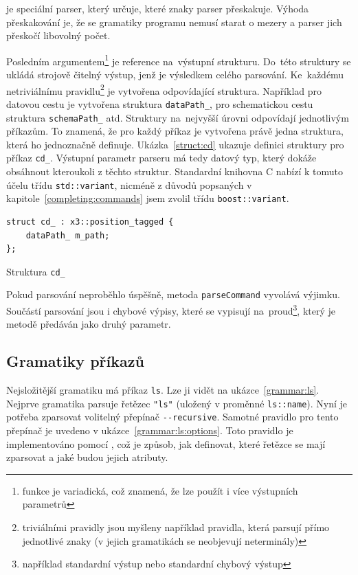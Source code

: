 \documentclass[thesis=B,czech,hidelinks]{FITthesis}[2019/03/06]
\newcommand{\Rplus}{\protect\hspace{-.1em}\protect\raisebox{.35ex}{\smaller{\smaller\textbf{+}}}}
\newcommand{\Cpp}{\mbox{C\Rplus\Rplus}\xspace}
\begin{document}
 je speciální parser, který určuje, které znaky parser přeskakuje. Výhoda přeskakování je, že se gramatiky programu nemusí starat o mezery a parser jich přeskočí libovolný počet.

Posledním argumentem\footnote{funkce je variadická, což znamená, že lze použít i více výstupních parametrů} je reference na~výstupní strukturu. Do~této struktury se ukládá strojově čitelný výstup, jenž je výsledkem celého parsování. Ke~každému netriviálnímu pravidlu\footnote{triviálními pravidly jsou myšleny například pravidla, která parsují přímo jednotlivé znaky (v jejich gramatikách se neobjevují neterminály)} je vytvořena odpovídající struktura. Například pro datovou cestu je vytvořena struktura \texttt{dataPath\_}, pro schematickou cestu struktura \texttt{schemaPath\_} atd. Struktury na~nejvyšší úrovni odpovídají jednotlivým příkazům. To znamená, že pro každý příkaz je vytvořena právě jedna struktura, která ho jednoznačně definuje. Ukázka~\ref{struct:cd} ukazuje definici struktury pro příkaz \texttt{cd\_}. Výstupní parametr parseru má tedy datový typ, který dokáže obsáhnout kteroukoli z těchto struktur. Standardní knihovna \Cpp{} nabízí k tomuto účelu třídu \texttt{std::variant}, nicméně z důvodů popsaných v kapitole~\ref{completing:commands} jsem zvolil třídu \texttt{boost::variant}.

\begin{listing}
\begin{verbatim}
struct cd_ : x3::position_tagged {
    dataPath_ m_path;
};
\end{verbatim}
\caption{Struktura \texttt{cd\_}}\label{struct:cd}
\end{listing}

Pokud parsování neproběhlo úspěšně, metoda \texttt{parseCommand} vyvolává výjimku. Součástí parsování jsou i chybové výpisy, které se vypisují na~proud\footnote{například standardní výstup nebo standardní chybový výstup}, který je metodě předáván jako druhý parametr.

\subsection{Gramatiky příkazů}
Nejsložitější gramatiku má příkaz \texttt{ls}. Lze ji vidět na ukázce~\ref{grammar:ls}. Nejprve gramatika parsuje řetězec \verb¨"ls"¨ (uložený v proměnné \verb¨ls::name¨). Nyní je potřeba zparsovat volitelný přepínač \verb¨--recursive¨. Samotné pravidlo pro tento přepínač je uvedeno v ukázce~\ref{grammar:ls:options}. Toto pravidlo je implementováno pomocí , což je způsob, jak definovat, které řetězce se mají zparsovat a jaké budou jejich atributy.
\end{document}
